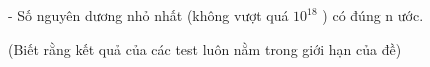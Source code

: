 - Số nguyên dương nhỏ nhất (không vượt quá $10^{18}$   ) có đúng n ước.   


   (Biết rằng kết quả của các test luôn nằm trong giới hạn của đề)